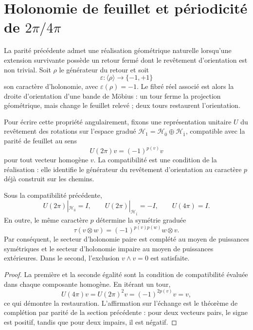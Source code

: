 \section{Holonomie de feuillet et périodicité de \texorpdfstring{\(2\pi/4\pi\)}{2pi/4pi}}

La parité précédente admet une réalisation géométrique naturelle lorsqu’une
extension survivante possède un retour fermé dont le revêtement d’orientation
est non trivial. Soit \(\rho\) le générateur du retour et soit
\[
 \varepsilon:\langle\rho\rangle\longrightarrow\{-1,+1\}
\]
son caractère d’holonomie, avec \(\varepsilon(\rho)=-1\). Le fibré réel
associé est alors la droite d’orientation d’une bande de Möbius : un
tour ferme la projection géométrique, mais change le feuillet relevé ; deux
tours restaurent l’orientation.

Pour écrire cette propriété angulairement, fixons une représentation
unitaire \(U\) du revêtement des rotations sur l’espace gradué
\(\mathcal H_1=\mathcal H_{\bar0}\oplus\mathcal H_{\bar1}\), compatible avec
la parité de feuillet au sens
\[
 U(2\pi)v=(-1)^{p(v)}v
\]
pour tout vecteur homogène \(v\). La compatibilité est une condition de la
réalisation : elle identifie le générateur du revêtement d’orientation au
caractère \(p\) déjà construit sur les chemins.

\begin{theorem}
\label{thm:dos-cuatro-pi-estadistica}
Sous la compatibilité précédente,
\[
 U(2\pi)|_{\mathcal H_{\bar0}}=I,
 \qquad
 U(2\pi)|_{\mathcal H_{\bar1}}=-I,
 \qquad
 U(4\pi)=I.
\]
En outre, le même caractère \(p\) détermine la symétrie graduée
\[
 \tau(v\otimes w)=(-1)^{p(v)p(w)}w\otimes v.
\]
Par conséquent, le secteur d’holonomie paire est complété au moyen de puissances
symétriques et le secteur d’holonomie impaire au moyen de puissances extérieures. Dans
le second, l’exclusion \(v\wedge v=0\) est satisfaite.
\end{theorem}

\begin{proof}
La première et la seconde égalité sont la condition de compatibilité évaluée
dans chaque composante homogène. En itérant un tour,
\[
 U(4\pi)v=U(2\pi)^2v=(-1)^{2p(v)}v=v,
\]
ce qui démontre la restauration. L'affirmation sur l'échange est le
théorème de complétion par parité de la section précédente : pour deux vecteurs
pairs, le signe est positif, tandis que pour deux impairs, il est négatif.
\end{proof}

